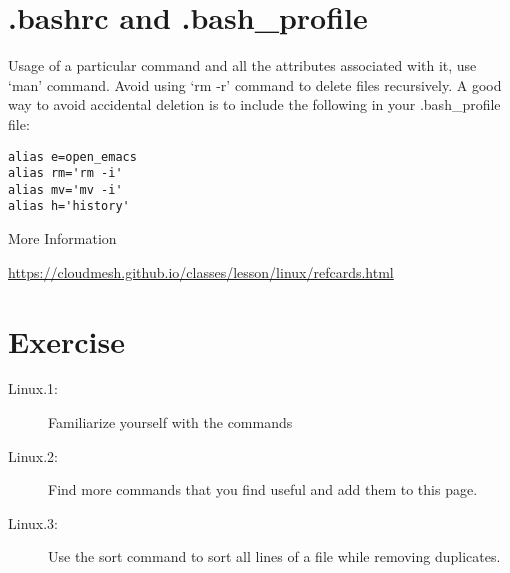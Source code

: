 \section{.bashrc and .bash\_profile}\label{bashrc-and-.bash_profile}

Usage of a particular command and all the attributes associated with it,
use `man' command. Avoid using `rm -r' command to delete files
recursively. A good way to avoid accidental deletion is to include the
following in your .bash\_profile file:

\begin{verbatim}
alias e=open_emacs
alias rm='rm -i'
alias mv='mv -i' 
alias h='history'
\end{verbatim}

More Information

\url{https://cloudmesh.github.io/classes/lesson/linux/refcards.html}

\section{Exercise}\label{exercise}

\begin{description}
\item[Linux.1:]
Familiarize yourself with the commands
\item[Linux.2:]
Find more commands that you find useful and add them to this page.
\item[Linux.3:]
Use the sort command to sort all lines of a file while removing
duplicates.
\end{description}
